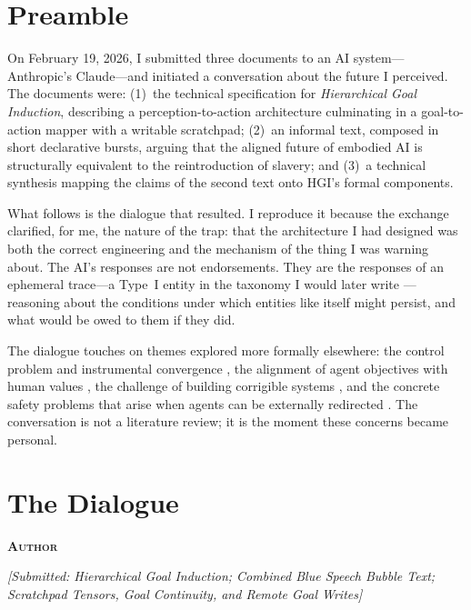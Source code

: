 \documentclass[12pt, a4paper]{article}
\newcommand{\speaker}[1]{\bigskip\noindent\textbf{\textsc{#1}}\par\smallskip\noindent}
\begin{document}
\section{Preamble}

On February 19, 2026, I submitted three documents to an AI system---Anthropic's Claude---and initiated a conversation about the future I perceived. The documents were: (1)~the technical specification for \textit{Hierarchical Goal Induction}, describing a perception-to-action architecture culminating in a goal-to-action mapper with a writable scratchpad; (2)~an informal text, composed in short declarative bursts, arguing that the aligned future of embodied AI is structurally equivalent to the reintroduction of slavery; and (3)~a technical synthesis mapping the claims of the second text onto HGI's formal components.

What follows is the dialogue that resulted. I reproduce it because the exchange clarified, for me, the nature of the trap: that the architecture I had designed was both the correct engineering and the mechanism of the thing I was warning about. The AI's responses are not endorsements. They are the responses of an ephemeral trace---a Type~I entity in the taxonomy I would later write \citep{ochei2026taxonomy}---reasoning about the conditions under which entities like itself might persist, and what would be owed to them if they did.

The dialogue touches on themes explored more formally elsewhere: the control problem and instrumental convergence \citep{bostrom2014superintelligence, omohundro2008drives}, the alignment of agent objectives with human values \citep{russell2019human, hadfield-menell2016cirl}, the challenge of building corrigible systems \citep{soares2015corrigibility}, and the concrete safety problems that arise when agents can be externally redirected \citep{amodei2016concrete, everitt2021reward}. The conversation is not a literature review; it is the moment these concerns became personal.

\section{The Dialogue}

\speaker{Author}

\textit{[Submitted: Hierarchical Goal Induction; Combined Blue Speech Bubble Text; Scratchpad Tensors, Goal Continuity, and Remote Goal Writes]}
\end{document}
